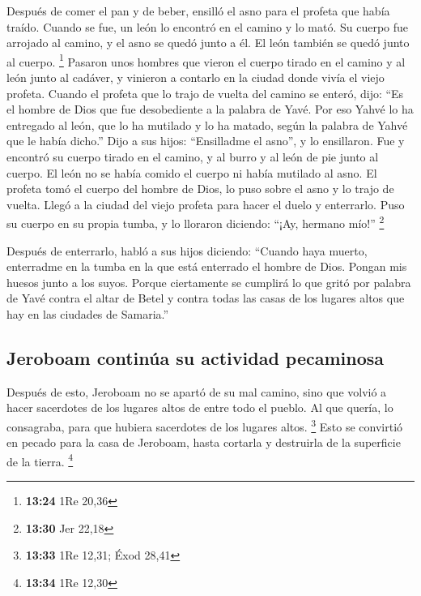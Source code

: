 \begin{paracol}{2}
 Después de comer el pan y de beber, ensilló el asno para
el profeta que había traído.  Cuando se fue, un león lo
encontró en el camino y lo mató. Su cuerpo fue arrojado al camino, y el
asno se quedó junto a él. El león también se quedó junto al cuerpo.
\footnote{\textbf{13:24} 1Re 20,36}  Pasaron unos hombres
que vieron el cuerpo tirado en el camino y al león junto al cadáver, y
vinieron a contarlo en la ciudad donde vivía el viejo profeta.
 Cuando el profeta que lo trajo de vuelta del camino se
enteró, dijo: ``Es el hombre de Dios que fue desobediente a la palabra
de Yavé. Por eso Yahvé lo ha entregado al león, que lo ha mutilado y lo
ha matado, según la palabra de Yahvé que le había dicho.''
 Dijo a sus hijos: ``Ensilladme el asno'', y lo
ensillaron.  Fue y encontró su cuerpo tirado en el
camino, y al burro y al león de pie junto al cuerpo. El león no se había
comido el cuerpo ni había mutilado al asno.  El profeta
tomó el cuerpo del hombre de Dios, lo puso sobre el asno y lo trajo de
vuelta. Llegó a la ciudad del viejo profeta para hacer el duelo y
enterrarlo.  Puso su cuerpo en su propia tumba, y lo
lloraron diciendo: ``¡Ay, hermano mío!'' \footnote{\textbf{13:30} Jer
  22,18}

 Después de enterrarlo, habló a sus hijos diciendo:
``Cuando haya muerto, enterradme en la tumba en la que está enterrado el
hombre de Dios. Pongan mis huesos junto a los suyos. 
Porque ciertamente se cumplirá lo que gritó por palabra de Yavé contra
el altar de Betel y contra todas las casas de los lugares altos que hay
en las ciudades de Samaria.''

\hypertarget{jeroboam-continuxfaa-su-actividad-pecaminosa}{%
\subsection{Jeroboam continúa su actividad
pecaminosa}\label{jeroboam-continuxfaa-su-actividad-pecaminosa}}

 Después de esto, Jeroboam no se apartó de su mal camino,
sino que volvió a hacer sacerdotes de los lugares altos de entre todo el
pueblo. Al que quería, lo consagraba, para que hubiera sacerdotes de los
lugares altos. \footnote{\textbf{13:33} 1Re 12,31; Éxod 28,41}
 Esto se convirtió en pecado para la casa de Jeroboam,
hasta cortarla y destruirla de la superficie de la tierra. \footnote{\textbf{13:34}
  1Re 12,30}


\end{paracol}
